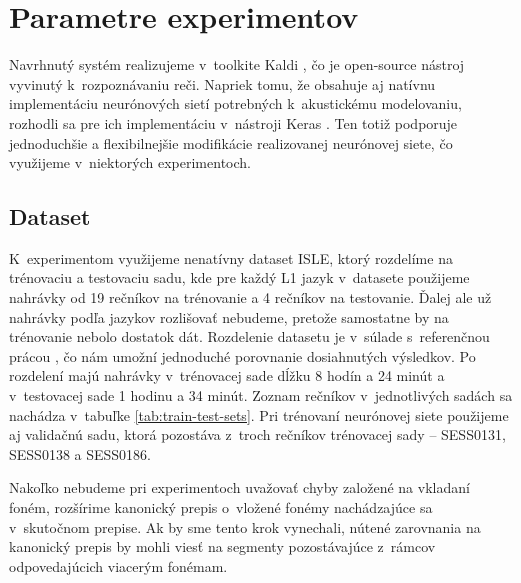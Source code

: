 \section{Parametre experimentov}

Navrhnutý systém realizujeme v~toolkite Kaldi \cite{Kaldi}, čo je open-source nástroj vyvinutý k~rozpoznávaniu reči. Napriek tomu, že obsahuje aj natívnu implementáciu neurónových sietí potrebných k~akustickému modelovaniu, rozhodli sa pre ich implementáciu v~nástroji Keras \cite{keras}. Ten totiž podporuje jednoduchšie a flexibilnejšie modifikácie realizovanej neurónovej siete, čo využijeme v~niektorých experimentoch.

\subsection*{Dataset}

K~experimentom využijeme nenatívny dataset ISLE, ktorý rozdelíme na trénovaciu a testovaciu sadu, kde pre každý L1 jazyk v~datasete použijeme nahrávky od 19 rečníkov na trénovanie a 4 rečníkov na testovanie. Ďalej ale už nahrávky podľa jazykov rozlišovať nebudeme, pretože samostatne by na trénovanie nebolo dostatok dát. Rozdelenie datasetu je v~súlade s~referenčnou prácou \cite{Arora2017}, čo nám umožní jednoduché porovnanie dosiahnutých výsledkov. Po rozdelení majú nahrávky v~trénovacej sade dĺžku 8 hodín a 24 minút a v~testovacej sade 1 hodinu a 34 minút. Zoznam rečníkov v~jednotlivých sadách sa nachádza v~tabuľke \ref{tab:train-test-sets}. Pri trénovaní neurónovej siete použijeme aj validačnú sadu, ktorá pozostáva z~troch rečníkov trénovacej sady -- SESS0131, SESS0138 a SESS0186.

Nakoľko nebudeme pri experimentoch uvažovať chyby založené na vkladaní foném, rozšírime kanonický prepis o~vložené fonémy nachádzajúce sa v~skutočnom prepise. Ak by sme tento krok vynechali, nútené zarovnania na kanonický prepis by mohli viesť na segmenty pozostávajúce z~rámcov odpovedajúcich viacerým fonémam.

